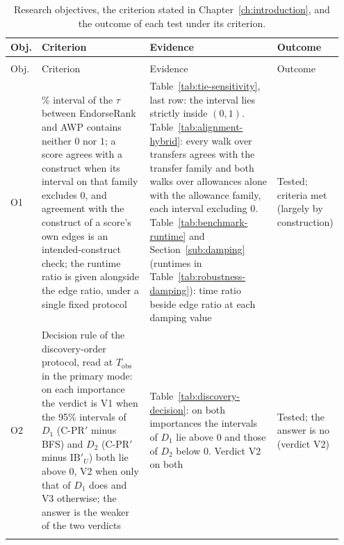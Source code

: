 {\footnotesize{}\setlength{\tabcolsep}{3.5pt}%
\begin{longtable}{@{}>{\raggedright\arraybackslash}p{0.05\linewidth}>{\raggedright\arraybackslash}p{0.34\linewidth}>{\raggedright\arraybackslash}p{0.39\linewidth}>{\raggedright\arraybackslash}p{0.17\linewidth}@{}}
\caption{Research objectives, the criterion stated in Chapter~\ref{ch:introduction}, and the outcome of each test under its criterion.}\label{tab:objectives-achievement}\\
\toprule
Obj. & Criterion & Evidence & Outcome \\
\midrule
\endfirsthead
\multicolumn{4}{@{}l}{\small Table~\thetable\ (continued)}\\
\toprule
Obj. & Criterion & Evidence & Outcome \\
\midrule
\endhead
\bottomrule
\endfoot
O1 & 95\% interval of the $\tau$ between EndorseRank and AWP contains neither $0$ nor $1$; a score agrees with a construct when its interval on that family excludes $0$, and agreement with the construct of a score's own edges is an intended-construct check; the runtime ratio is given alongside the edge ratio, under a single fixed protocol & Table~\ref{tab:tie-sensitivity}, last row: the interval lies strictly inside $(0,1)$. Table~\ref{tab:alignment-hybrid}: every walk over transfers agrees with the transfer family and both walks over allowances alone with the allowance family, each interval excluding $0$. Table~\ref{tab:benchmark-runtime} and Section~\ref{sub:damping} (runtimes in Table~\ref{tab:robustness-damping}): time ratio beside edge ratio at each damping value & Tested; criteria met (largely by construction) \\
\addlinespace
O2 & Decision rule of the discovery-order protocol, read at $T_{\mathrm{obs}}$ in the primary mode: on each importance the verdict is V1 when the 95\% intervals of $D_1$ (\mbox{C-PR}$'$ minus BFS) and $D_2$ (\mbox{C-PR}$'$ minus $\mathrm{IB}'_U$) both lie above $0$, V2 when only that of $D_1$ does and V3 otherwise; the answer is the weaker of the two verdicts & Table~\ref{tab:discovery-decision}: on both importances the intervals of $D_1$ lie above $0$ and those of $D_2$ below $0$. Verdict V2 on both & Tested; the answer is no (verdict V2) \\
\addlinespace

\end{longtable}}

